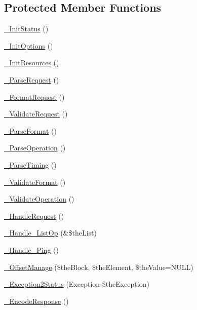 \subsection*{Protected Member Functions}
\begin{DoxyCompactItemize}
\item 
\hyperlink{class_c_wrapper_a8369eec2e53b3f6394a35bcd919d8779}{\-\_\-\-Init\-Status} ()
\item 
\hyperlink{class_c_wrapper_aec2fa3594e36a380d66743b47c24490c}{\-\_\-\-Init\-Options} ()
\item 
\hyperlink{class_c_wrapper_a0e5c5488fce4b388e43dcf6810874d74}{\-\_\-\-Init\-Resources} ()
\item 
\hyperlink{class_c_wrapper_a6675c744053f1b05547ad28fc50a79e6}{\-\_\-\-Parse\-Request} ()
\item 
\hyperlink{class_c_wrapper_a2a3d95961650654468789883ab1607e5}{\-\_\-\-Format\-Request} ()
\item 
\hyperlink{class_c_wrapper_a24b22cfd0022c1cba1741fb294fba5ba}{\-\_\-\-Validate\-Request} ()
\item 
\hyperlink{class_c_wrapper_a53d59f3a61137b8d6f5707d794e2961a}{\-\_\-\-Parse\-Format} ()
\item 
\hyperlink{class_c_wrapper_aa090c135ca1085f46d8cddd393131ea6}{\-\_\-\-Parse\-Operation} ()
\item 
\hyperlink{class_c_wrapper_a13421345af75888b1fa8bcd3381b52a5}{\-\_\-\-Parse\-Timing} ()
\item 
\hyperlink{class_c_wrapper_a8994ff7a5f94438da1c5e3505b145dbd}{\-\_\-\-Validate\-Format} ()
\item 
\hyperlink{class_c_wrapper_aab3f7b2ca4cd9e692c35510d753918a4}{\-\_\-\-Validate\-Operation} ()
\item 
\hyperlink{class_c_wrapper_a12c1dd1f1d1cf0ae889cc19ff17ced0e}{\-\_\-\-Handle\-Request} ()
\item 
\hyperlink{class_c_wrapper_aeff4d2ab12617c1dda2bed705a6969bb}{\-\_\-\-Handle\-\_\-\-List\-Op} (\&\$the\-List)
\item 
\hyperlink{class_c_wrapper_ab58ee7076059e0f992c2a642043b764f}{\-\_\-\-Handle\-\_\-\-Ping} ()
\item 
\hyperlink{class_c_wrapper_aff9eb1799c8f30cb33967c7a50ce6395}{\-\_\-\-Offset\-Manage} (\$the\-Block, \$the\-Element, \$the\-Value=N\-U\-L\-L)
\item 
\hyperlink{class_c_wrapper_ad8dd05c155df0d8fe19be35d4bb67b56}{\-\_\-\-Exception2\-Status} (Exception \$the\-Exception)
\item 
\hyperlink{class_c_wrapper_a60583bacf329d484d01df9851602759f}{\-\_\-\-Encode\-Response} ()
\end{DoxyCompactItemize}
